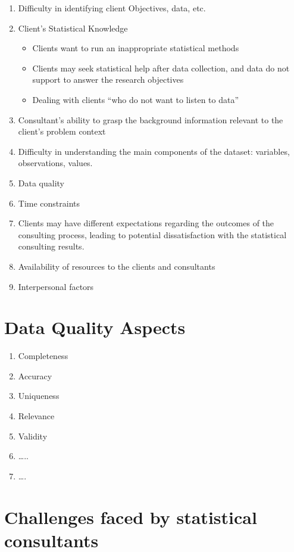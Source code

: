 \documentclass[
  letterpaper,
  DIV=11,
  numbers=noendperiod]{scrreprt}
\begin{document}
\begin{enumerate}
\def\labelenumi{\arabic{enumi}.}
\item
  Difficulty in identifying client Objectives, data, etc.
\item
  Client's Statistical Knowledge

  \begin{itemize}
  \item
    Clients want to run an inappropriate statistical methods
  \item
    Clients may seek statistical help after data collection, and data do
    not support to answer the research objectives
  \item
    Dealing with clients ``who do not want to listen to data''
  \end{itemize}
\item
  Consultant's ability to grasp the background information relevant to
  the client's problem context
\item
  Difficulty in understanding the main components of the dataset:
  variables, observations, values.
\item
  Data quality
\item
  Time constraints
\item
  Clients may have different expectations regarding the outcomes of the
  consulting process, leading to potential dissatisfaction with the
  statistical consulting results.
\item
  Availability of resources to the clients and consultants
\item
  Interpersonal factors
\end{enumerate}

\section{Data Quality Aspects}\label{data-quality-aspects}

\begin{enumerate}
\def\labelenumi{\arabic{enumi}.}
\item
  Completeness
\item
  Accuracy
\item
  Uniqueness
\item
  Relevance
\item
  Validity
\item
  \ldots..
\item
  \ldots.
\end{enumerate}

\section{Challenges faced by statistical
consultants}\label{challenges-faced-by-statistical-consultants}
\end{document}
